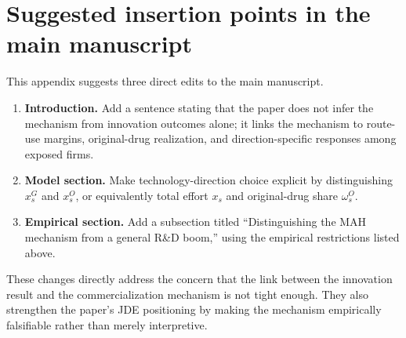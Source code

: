 \documentclass[12pt]{article}
\begin{document}
\section{Suggested insertion points in the main manuscript}

This appendix suggests three direct edits to the main manuscript.

\begin{enumerate}
    \item \textbf{Introduction.} Add a sentence stating that the paper does not infer the mechanism from innovation outcomes alone; it links the mechanism to route-use margins, original-drug realization, and direction-specific responses among exposed firms.
    \item \textbf{Model section.} Make technology-direction choice explicit by distinguishing $x_s^G$ and $x_s^O$, or equivalently total effort $x_s$ and original-drug share $\omega_s^O$.
    \item \textbf{Empirical section.} Add a subsection titled ``Distinguishing the MAH mechanism from a general R\&D boom,'' using the empirical restrictions listed above.
\end{enumerate}

These changes directly address the concern that the link between the innovation result and the commercialization mechanism is not tight enough. They also strengthen the paper's JDE positioning by making the mechanism empirically falsifiable rather than merely interpretive.
\end{document}
